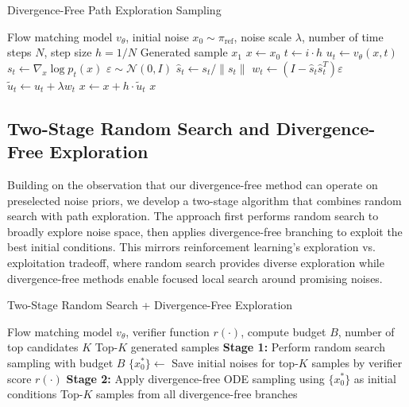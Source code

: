 \documentclass{article}
\begin{document}
\begin{algorithm}[H]
\caption{Divergence-Free Path Exploration Sampling}
\label{alg:divergence-free-sampling}
\begin{algorithmic}[1]
\Require Flow matching model $v_\theta$, initial noise $x_0 \sim \pi_{\text{ref}}$, noise scale $\lambda$, number of time steps $N$, step size $h = 1/N$
\Ensure Generated sample $x_1$
\State $x \leftarrow x_0$
    \State $t \leftarrow i \cdot h$
    \State $u_t \leftarrow v_\theta(x, t)$ 
    \State $s_t \leftarrow \nabla_x \log p_t(x)$ 
    \State $\varepsilon \sim \mathcal{N}(0, I)$ 
    \State $\hat{s}_t \leftarrow s_t / \|s_t\|$ 
    \State $w_t \leftarrow (I - \hat{s}_t \hat{s}_t^T) \varepsilon$ 
    \State $\tilde{u}_t \leftarrow u_t + \lambda w_t$ 
    \State $x \leftarrow x + h \cdot \tilde{u}_t$ 
\EndFor
\State \Return $x$
\end{algorithmic}
\end{algorithm}

\subsection{Two-Stage Random Search and Divergence-Free Exploration}
Building on the observation that our divergence-free method can operate on preselected noise priors, we develop a two-stage algorithm that combines random search with path exploration. The approach first performs random search to broadly explore noise space, then applies divergence-free branching to exploit the best initial conditions. This mirrors reinforcement learning's exploration vs. exploitation tradeoff, where random search provides diverse exploration while divergence-free methods enable focused local search around promising noises.

\begin{algorithm}[H]
\caption{Two-Stage Random Search + Divergence-Free Exploration}
\label{alg:two-stage-sampling}
\begin{algorithmic}[1]
\Require Flow matching model $v_\theta$, verifier function $r(\cdot)$, compute budget $B$, number of top candidates $K$
\Ensure Top-$K$ generated samples
\State \textbf{Stage 1:} Perform random search sampling with budget $B$
\State $\{x_0^*\} \leftarrow$ Save initial noises for top-$K$ samples by verifier score $r(\cdot)$
\State \textbf{Stage 2:} Apply divergence-free ODE sampling using $\{x_0^*\}$ as initial conditions
\State \Return Top-$K$ samples from all divergence-free branches
\end{algorithmic}
\end{algorithm}
\end{document}
